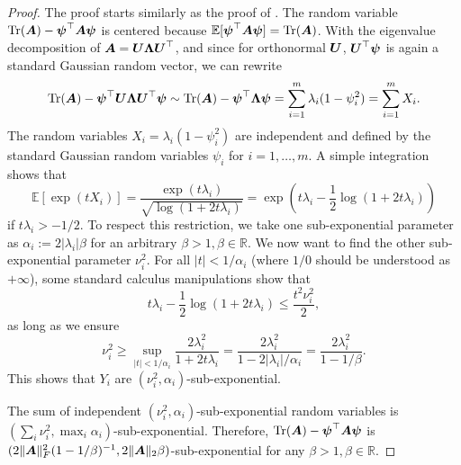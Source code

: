 \begin{proof}
    The proof starts similarly as the proof of \cite[Lemma 3]{cortinovis-2022-randomized-trace}. The random variable $\operatorname{Tr}(\boldsymbol{A}) - \boldsymbol{\psi}^{\top} \boldsymbol{A} \boldsymbol{\psi}$ is centered because $\mathbb{E}[\boldsymbol{\psi}^{\top} \boldsymbol{A} \boldsymbol{\psi}] = \operatorname{Tr}(\boldsymbol{A})$. With the eigenvalue decomposition of $\boldsymbol{A} = \boldsymbol{U} \boldsymbol{\Lambda} \boldsymbol{U}^{\top}$, and since for orthonormal $\boldsymbol{U}$, $\boldsymbol{U}^{\top} \boldsymbol{\psi}$ is again a standard Gaussian random vector, we can rewrite
    \begin{equation}
        \operatorname{Tr}(\boldsymbol{A}) - \boldsymbol{\psi}^{\top} \boldsymbol{U}\boldsymbol{\Lambda} \boldsymbol{U}^{\top} \boldsymbol{\psi}  \sim \operatorname{Tr}(\boldsymbol{A}) - \boldsymbol{\psi}^{\top} \boldsymbol{\Lambda} \boldsymbol{\psi}  = \sum_{i=1}^{m} \lambda_i (1 - \psi_i^2) = \sum_{i=1}^{m} X_i.
    \end{equation}
    The random variables $X_i = \lambda_i(1 - \psi_i^2)$ are independent and defined by the standard Gaussian random variables $\psi_i$ for $i=1, \dots, m$. A simple integration shows that
    \begin{equation}
        \mathbb{E}[\exp(t X_i)] = \frac{\exp\left(t \lambda_i\right) }{\sqrt{\log(1 + 2t \lambda_i)}} = \exp\left(t \lambda_i - \frac{1}{2} \log(1 + 2t \lambda_i) \right)
    \end{equation}
    if $t \lambda_i > - 1/2$. To respect this restriction, we take one sub-exponential parameter as $\alpha_i := 2 |\lambda_i| \beta$ for an arbitrary $\beta > 1, \beta \in \mathbb{R}$. We now want to find the other sub-exponential parameter $\nu_i^2$. For all $|t| < 1 / \alpha_i$ (where $1/0$ should be understood as $+ \infty$), some standard calculus manipulations show that
    \begin{equation}
        t \lambda_i - \frac{1}{2} \log(1 + 2t \lambda_i) \leq \frac{t^2 \nu_i^2}{2},
    \end{equation}
    as long as we ensure
    \begin{equation}
        \nu_i^2 \geq \sup_{|t| < 1 / \alpha_i} \frac{2 \lambda_i^2}{1 + 2 t \lambda_i} = \frac{2 \lambda_i^2}{1 - 2 |\lambda_i| / \alpha_i} = \frac{2 \lambda_i^2}{1 - 1 / \beta}.
    \end{equation}
    This shows that $Y_i$ are $(\nu_i^2, \alpha_i)$-sub-exponential.

    The sum of independent $(\nu_i^2, \alpha_i)$-sub-exponential random variables is $(\sum_i \nu_i^2, \max_i \alpha_i)$-sub-exponential. Therefore, $\operatorname{Tr}(\boldsymbol{A}) - \boldsymbol{\psi}^{\top} \boldsymbol{A} \boldsymbol{\psi}$ is $(2 \lVert \boldsymbol{A} \rVert _F^2 (1 - 1/\beta)^{-1}, 2 \lVert \boldsymbol{A} \rVert _2 \beta)$-sub-exponential for any $\beta > 1, \beta \in \mathbb{R}$.
\end{proof}

